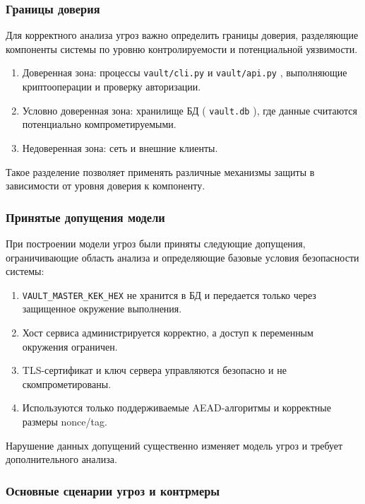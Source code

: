 \documentclass[14pt, a4paper]{extarticle}
\renewcommand{\texttt}[1]{%
  {\def\UrlFont{\ttfamily}\nolinkurl{#1}}%
}
\begin{document}
	\subsubsection{Границы доверия}
	
	Для корректного анализа угроз важно определить границы доверия, разделяющие компоненты системы по уровню контролируемости и потенциальной уязвимости.
	
	\begin{enumerate}
	\item Доверенная зона: процессы \texttt{vault/cli.py} и \texttt{vault/api.py}, выполняющие криптооперации и проверку авторизации.
	\item Условно доверенная зона: хранилище БД (\texttt{vault.db}), где данные считаются потенциально компрометируемыми.
	\item Недоверенная зона: сеть и внешние клиенты.
	\end{enumerate}
	
	Такое разделение позволяет применять различные механизмы защиты в зависимости от уровня доверия к компоненту.
		
	\subsubsection{Принятые допущения модели}
	
	При построении модели угроз были приняты следующие допущения, ограничивающие область анализа и определяющие базовые условия безопасности системы:
	
	\begin{enumerate}
	\item \texttt{VAULT\_MASTER\_KEK\_HEX} не хранится в БД и передается только через защищенное окружение выполнения.
	\item Хост сервиса администрируется корректно, а доступ к переменным окружения ограничен.
	\item TLS-сертификат и ключ сервера управляются безопасно и не скомпрометированы.
	\item Используются только поддерживаемые AEAD-алгоритмы и корректные размеры nonce/tag.
	\end{enumerate}
	
	Нарушение данных допущений существенно изменяет модель угроз и требует дополнительного анализа.
		
	\subsubsection{Основные сценарии угроз и контрмеры}
	
\end{document}
